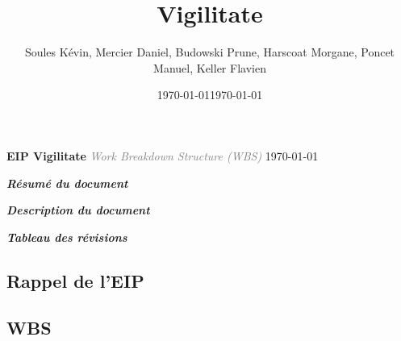 \documentclass[a4paper,12pt]{report}
\title{\doctitle{} Vigilitate}
\author{Soules Kévin, Mercier Daniel, Budowski Prune, Harscoat Morgane, Poncet Manuel, Keller Flavien}
\date{\today}
\newcommand{\doctitle}{WBS}
\newcommand{\doclongtitle}{Work Breakdown Structure}
\begin{document}
\date{\slashdate\today}
\setcounter{page}{-10}


\thispagestyle{empty}
\begin{center}
  \textcolor{myBlue}{\Huge \textbf{EIP Vigilitate}}\linebreak
  \textcolor{gray}{\textit{\Large \doclongtitle{} (\doctitle{})}}\linebreak
  {\today}
\end{center}
\newpage


\begin{flushleft}
  \textcolor{myBlue}{\textit{\large \textbf{Résumé du document}}}\linebreak
\end{flushleft}

\newpage


\begin{flushleft}
  \textcolor{myBlue}{\textit{\large \textbf{Description du document}}} 
  \bigbreak
  
  \bigbreak
  \bigbreak
  \textcolor{myBlue}{\textit{\large \textbf{Tableau des révisions}}}
  \bigbreak
  
\end{flushleft}


\tableofcontents


\textcolor{myBlue}{\chapter{Rappel de l'EIP}}
\setcounter{page}{1}





\let\clearpage\relax
\textcolor{myBlue}{\chapter{WBS}}
\end{document}
